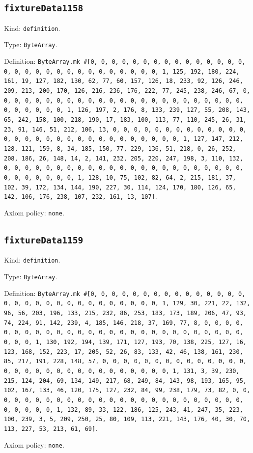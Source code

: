 \documentclass[11pt]{article}
\begin{document}
\subsection*{\texttt{fixtureData1158}}
\noindent Kind: \texttt{definition}.\par
\noindent Type: \texttt{ByteArray}.\par
\noindent Definition: \texttt{ByteArray.mk \#[0, 0, 0, 0, 0, 0, 0, 0, 0, 0, 0, 0, 0, 0, 0, 0, 0, 0, 0, 0, 0, 0, 0, 0, 0, 0, 0, 0, 0, 0, 1, 125, 192, 180, 224, 161, 19, 127, 182, 130, 62, 77, 60, 157, 126, 18, 233, 92, 126, 246, 209, 213, 200, 170, 126, 216, 236, 176, 222, 77, 245, 238, 246, 67, 0, 0, 0, 0, 0, 0, 0, 0, 0, 0, 0, 0, 0, 0, 0, 0, 0, 0, 0, 0, 0, 0, 0, 0, 0, 0, 0, 0, 0, 0, 1, 126, 197, 2, 176, 8, 133, 239, 127, 55, 208, 143, 65, 242, 158, 100, 218, 190, 17, 183, 100, 113, 77, 110, 245, 26, 31, 23, 91, 146, 51, 212, 106, 13, 0, 0, 0, 0, 0, 0, 0, 0, 0, 0, 0, 0, 0, 0, 0, 0, 0, 0, 0, 0, 0, 0, 0, 0, 0, 0, 0, 0, 0, 0, 1, 127, 147, 212, 128, 121, 159, 8, 34, 185, 150, 77, 229, 136, 51, 218, 0, 26, 252, 208, 186, 26, 148, 14, 2, 141, 232, 205, 220, 247, 198, 3, 110, 132, 0, 0, 0, 0, 0, 0, 0, 0, 0, 0, 0, 0, 0, 0, 0, 0, 0, 0, 0, 0, 0, 0, 0, 0, 0, 0, 0, 0, 0, 0, 1, 128, 10, 75, 102, 82, 64, 2, 215, 181, 37, 102, 39, 172, 134, 144, 190, 227, 30, 114, 124, 170, 180, 126, 65, 142, 106, 176, 238, 107, 232, 161, 13, 107]}.\par
\noindent Axiom policy: \texttt{none}.\par
\subsection*{\texttt{fixtureData1159}}
\noindent Kind: \texttt{definition}.\par
\noindent Type: \texttt{ByteArray}.\par
\noindent Definition: \texttt{ByteArray.mk \#[0, 0, 0, 0, 0, 0, 0, 0, 0, 0, 0, 0, 0, 0, 0, 0, 0, 0, 0, 0, 0, 0, 0, 0, 0, 0, 0, 0, 0, 0, 1, 129, 30, 221, 22, 132, 96, 56, 203, 196, 133, 215, 232, 86, 253, 183, 173, 189, 206, 47, 93, 74, 224, 91, 142, 239, 4, 185, 146, 218, 37, 169, 77, 8, 0, 0, 0, 0, 0, 0, 0, 0, 0, 0, 0, 0, 0, 0, 0, 0, 0, 0, 0, 0, 0, 0, 0, 0, 0, 0, 0, 0, 0, 0, 1, 130, 192, 194, 139, 171, 127, 193, 70, 138, 225, 127, 16, 123, 168, 152, 223, 17, 205, 52, 26, 83, 133, 42, 46, 138, 161, 230, 85, 217, 191, 228, 148, 57, 0, 0, 0, 0, 0, 0, 0, 0, 0, 0, 0, 0, 0, 0, 0, 0, 0, 0, 0, 0, 0, 0, 0, 0, 0, 0, 0, 0, 0, 0, 1, 131, 3, 39, 230, 215, 124, 204, 69, 134, 149, 217, 68, 249, 84, 143, 98, 193, 165, 95, 102, 167, 133, 46, 120, 175, 127, 232, 84, 99, 238, 179, 73, 82, 0, 0, 0, 0, 0, 0, 0, 0, 0, 0, 0, 0, 0, 0, 0, 0, 0, 0, 0, 0, 0, 0, 0, 0, 0, 0, 0, 0, 0, 0, 1, 132, 89, 33, 122, 186, 125, 243, 41, 247, 35, 223, 100, 239, 3, 5, 209, 250, 25, 80, 109, 113, 221, 143, 176, 40, 30, 70, 113, 227, 53, 213, 61, 69]}.\par
\noindent Axiom policy: \texttt{none}.\par
\end{document}
